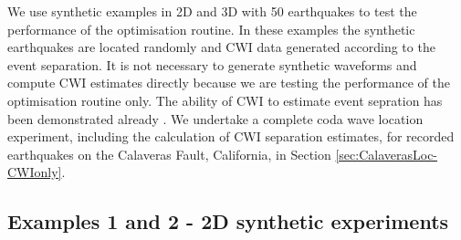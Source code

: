 \documentclass[extra, onecolumn, doublespacing]{gji}
\begin{document}
We use synthetic examples in 2D and 3D with 50 earthquakes to test
the performance of the optimisation routine. In these examples the
synthetic earthquakes are located randomly and CWI data generated
according to the event separation. It is not necessary to generate
synthetic waveforms and compute CWI estimates directly because we
are testing the performance of the optimisation routine only. The
ability of CWI to estimate event sepration has been demonstrated
already \citep{dr_Snieder05a, dr_Robinson11a, dr_Robinson07b}. We
undertake a complete coda wave location experiment, including the
calculation of CWI separation estimates, for recorded earthquakes on
the Calaveras Fault, California, in Section
\ref{sec:CalaverasLoc-CWIonly}.

\subsection{Examples 1 and 2 - 2D synthetic experiments}
\end{document}

